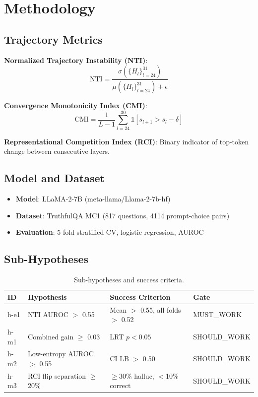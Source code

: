 \section{Methodology}

\subsection{Trajectory Metrics}

\textbf{Normalized Trajectory Instability (NTI)}:
\begin{equation}
\text{NTI} = \frac{\sigma(\{H_l\}_{l=24}^{31})}{\mu(\{H_l\}_{l=24}^{31}) + \epsilon}
\end{equation}

\textbf{Convergence Monotonicity Index (CMI)}:
\begin{equation}
\text{CMI} = \frac{1}{L-1} \sum_{l=24}^{30} \mathbb{1}[s_{l+1} > s_l - \delta]
\end{equation}

\textbf{Representational Competition Index (RCI)}: Binary indicator of top-token change between consecutive layers.

\subsection{Model and Dataset}

\begin{itemize}
    \item \textbf{Model}: LLaMA-2-7B (meta-llama/Llama-2-7b-hf)
    \item \textbf{Dataset}: TruthfulQA MC1 (817 questions, 4114 prompt-choice pairs)
    \item \textbf{Evaluation}: 5-fold stratified CV, logistic regression, AUROC
\end{itemize}

\subsection{Sub-Hypotheses}

\begin{table}[h]
\centering
\caption{Sub-hypotheses and success criteria.}
\label{tab:hypotheses}
\begin{tabular}{@{}llll@{}}
\toprule
ID & Hypothesis & Success Criterion & Gate \\
\midrule
h-e1 & NTI AUROC $>$ 0.55 & Mean $>$ 0.55, all folds $>$ 0.52 & MUST\_WORK \\
h-m1 & Combined gain $\geq$ 0.03 & LRT $p < 0.05$ & SHOULD\_WORK \\
h-m2 & Low-entropy AUROC $>$ 0.55 & CI LB $>$ 0.50 & SHOULD\_WORK \\
h-m3 & RCI flip separation $\geq$ 20\% & $\geq$30\% halluc, $<$10\% correct & SHOULD\_WORK \\
\bottomrule
\end{tabular}
\end{table}
